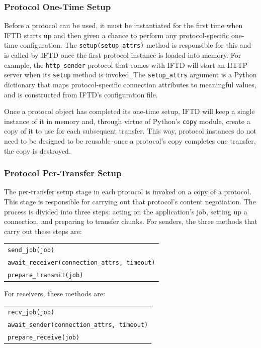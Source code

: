\subsubsection{Protocol One-Time Setup}

Before a protocol can be used, it must be instantiated for the first time when IFTD starts up and then given a chance to perform any protocol-specific one-time configuration.  The \texttt{setup(setup\_attrs)} method is responsible for this and is called by IFTD once the first protocol instance is loaded into memory.  For example, the \texttt{http\_sender} protocol that comes with IFTD will start an HTTP server when its \texttt{setup} method is invoked.  The \texttt{setup\_attrs} argument is a Python dictionary that maps protocol-specific connection attributes to meaningful values, and is constructed from IFTD's configuration file.

Once a protocol object has completed its one-time setup, IFTD will keep a single instance of it in memory and, through virtue of Python's \texttt{copy} module, create a copy of it to use for each subsequent transfer.  This way, protocol instances do not need to be designed to be reusable--once a protocol's copy completes one transfer, the copy is destroyed.

\subsubsection{Protocol Per-Transfer Setup}

The per-transfer setup stage in each protocol is invoked on a copy of a protocol.  This stage is responsible for carrying out that protocol's content negotiation.  The process is divided into three steps:  acting on the application's job, setting up a connection, and preparing to transfer chunks.  For senders, the three methods that carry out these steps are:

\begin{table}[ht!]
\begin{tabular}{ l }
\indent \texttt{send\_job(job)} \\
\indent \texttt{await\_receiver(connection\_attrs, timeout)} \\
\indent \texttt{prepare\_transmit(job)} \\
\end{tabular}
\end{table}

\noindent For receivers, these methods are:

\begin{table}[ht!]
\begin{tabular}{ l }
\indent \texttt{recv\_job(job)} \\
\indent \texttt{await\_sender(connection\_attrs, timeout)} \\
\indent \texttt{prepare\_receive(job)} \\
\end{tabular}
\end{table}

